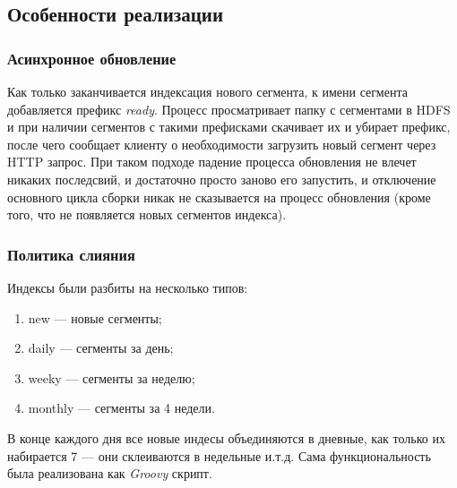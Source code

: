 \subsection{Особенности реализации}
\subsubsection{Асинхронное обновление}
Как только заканчивается индексация нового сегмента, к имени сегмента добавляется префикс \textit{ready}. Процесс просматривает папку с сегментами в HDFS и при наличии сегментов с такими префисками скачивает их и убирает префикс, после чего сообщает клиенту о необходимости загрузить новый сегмент через HTTP запрос. При таком подходе падение процесса обновления не влечет никаких последсвий, и достаточно просто заново его запустить, и отключение основного цикла сборки никак не сказывается на процесс обновления (кроме того, что не появляется новых сегментов индекса).
\subsubsection{Политика слияния}
Индексы были разбиты на несколько типов:
\begin{enumerate}
 \item new --- новые сегменты;
 \item daily --- сегменты за день;
 \item weeky --- сегменты за неделю;
 \item monthly --- сегменты за 4 недели.
\end{enumerate}
В конце каждого дня все новые индесы объединяются в дневные, как только их набирается 7 --- они склеиваются в недельные и.т.д. Сама функциональность была реализована как \textit{Groovy} скрипт. 
